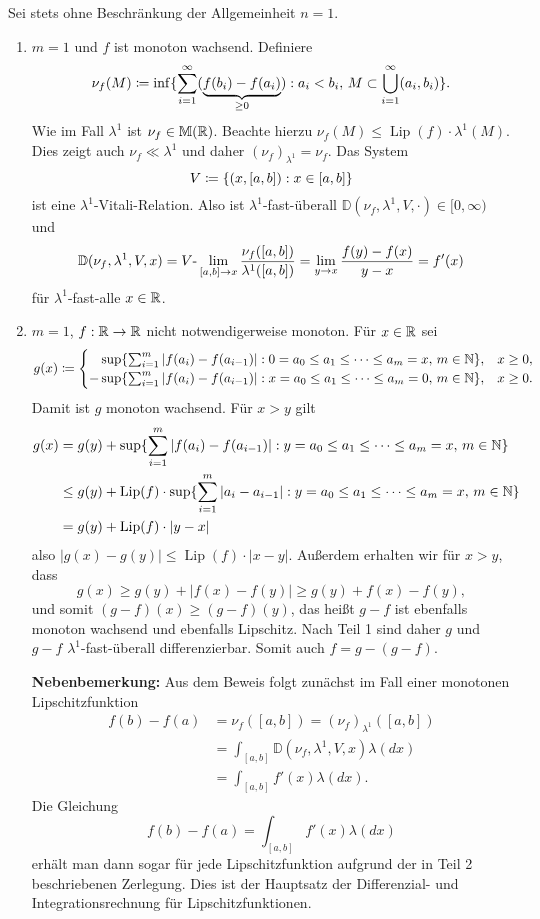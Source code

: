 \documentclass[a4paper,twoside,DIV15,BCOR12mm]{scrbook}
\DeclareMathOperator{\Lip}{Lip}
\begin{document}
\begin{beweis}
Sei stets ohne Beschränkung der Allgemeinheit $n=1$.
\begin{enumerate}[{Teil} 1:]
\item $m=1$ und $f$ ist monoton wachsend. Definiere
\[
\nu_f(M) \da \inf\{\sum_{i=1}^\infty (\underbrace{f(b_i) - f(a_i)}_{\ge 0}): a_i < b_i,\, M\subset \bigcup_{i=1}^\infty (a_i,b_i)\}.
\]
Wie im Fall $\lambda^1$ ist $\nu_f\in\mathbb M (\mathbb{R})$. Beachte hierzu $\nu_f(M) \le \Lip(f) \cdot \lambda^1(M)$. Dies zeigt auch $\nu_f \ll \lambda^1$ und daher $(\nu_f)_{\lambda^1} = \nu_f$. Das System
\[
V \da \{ (x,[a,b]): x\in[a,b]\}
\]
ist eine $\lambda^1$-Vitali-Relation. Also ist $\lambda^1$-fast-überall $\mathbb D(\nu_f,\lambda^1,V,\cdot) \in [0,\infty)$  und
\[
\mathbb D(\nu_f,\lambda^1,V,x)
= V\text-\lim_{[a,b]\to x} \frac{\nu_f([a,b])}{\lambda^1([a,b])}
= \lim_{y\to x} \frac{f(y) - f(x) }{y-x} = f'(x)
\]
für $\lambda^1$-fast-alle $x\in\mathbb{R}$.

\item $m=1$, $f:\mathbb{R}\to\mathbb{R}$ nicht notwendigerweise monoton. Für $x\in \mathbb{R}$ sei
\[
g(x) \da 
\begin{cases}
\phantom{-}\sup\{\sum_{i=1}^m|f(a_i)-f(a_{i-1})| : 0 = a_0 \le a_1 \le \cdots \le a_m = x, \, m\in\MdN\}, & x\ge 0,\\
-\sup\{\sum_{i=1}^m|f(a_i)-f(a_{i-1})| : x = a_0 \le a_1 \le \cdots \le a_m = 0, \, m\in\MdN\}, & x\ge 0.
\end{cases}
\]
Damit ist $g$ monoton wachsend. Für $x>y$ gilt
\begin{align*}
g(x)
&= g(y) + \sup\{\sum_{i=1}^m |f(a_i) - f(a_{i-1})|: y = a_0\le a_1\le \cdots \le a_m = x,\, m\in\MdN\} \\
&\le g(y) + \Lip(f) \cdot \sup\{\sum_{i=1}^m |a_i-a_{i-1}|: y = a_0\le a_1\le \cdots \le a_m = x,\, m\in\MdN\} \\
&= g(y) + \Lip(f) \cdot |y-x|
\end{align*}
also $|g(x) - g(y)| \le \Lip(f) \cdot |x-y|$. Außerdem erhalten wir für $x>y$, dass
\[
g(x)\ge g(y) + |f(x)-f(y)| \ge g(y) + f(x) - f(y),
\]
und somit $(g-f)(x) \ge (g-f)(y)$, das heißt $g-f$ ist ebenfalls monoton wachsend und ebenfalls Lipschitz. Nach Teil 1 sind daher $g$ und $g-f$ $\lambda^1$-fast-überall differenzierbar. Somit auch $f=g-(g-f)$.

\textbf{Nebenbemerkung:} Aus dem Beweis folgt zunächst im Fall einer monotonen Lipschitzfunktion 
\begin{align*}
f(b)-f(a) &= \nu_f([a,b]) = (\nu_f)_{\lambda^1}([a,b])\\
& = \int_{[a,b]} \mathbb D(\nu_f, \lambda^1, V, x)\lambda(dx)\\
& = \int_{[a,b]} f'(x) \lambda(dx).
\end{align*}
Die Gleichung
$$
f(b)-f(a)= \int_{[a,b]} f'(x) \lambda(dx)
$$
erhält man dann sogar für jede Lipschitzfunktion aufgrund der in Teil 2 beschriebenen Zerlegung. 
Dies ist der Hauptsatz der Differenzial- und Integrationsrechnung für Lipschitzfunktionen.


\end{enumerate}
\end{beweis}
\end{document}
